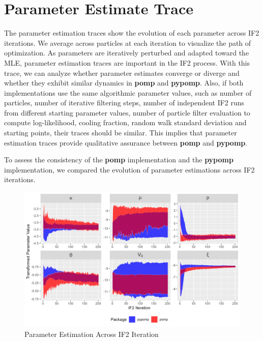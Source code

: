 \documentclass[11pt]{report}
\begin{document}
\section{Parameter Estimate Trace}\label{sec:param_est}
The parameter estimation traces show the evolution of each parameter across IF2 iterations. We average across particles at each iteration to visualize the path of optimization. As parameters are iteratively perturbed and adapted toward the MLE, parameter estimation traces are important in the IF2 process. With this trace, we can analyze whether parameter estimates converge or diverge and whether they exhibit similar dynamics in \textbf{pomp} and \textbf{pypomp}. Also, if both implementations use the same algorithmic parameter values, such as number of particles, number of iterative filtering steps, number of independent IF2 runs from different starting parameter values, number of particle filter evaluation to compute log-likelihood, cooling fraction, random walk standard deviation and starting points, their traces should be similar. This implies that parameter estimation traces provide qualitative assurance between \textbf{pomp} and \textbf{pypomp}.


To assess the consistency of the \textbf{pomp} implementation and the \textbf{pypomp} implementation, we compared the evolution of parameter estimations across IF2 iterations. 


\begin{figure}[ht]
\begin{center}
\includegraphics[width=\textwidth]{param_trace_ribbon_plot.png}
\end{center}
\caption{Parameter Estimation Across IF2 Iteration}
\label{fig:if2paramtrace}
\end{figure}
\end{document}
